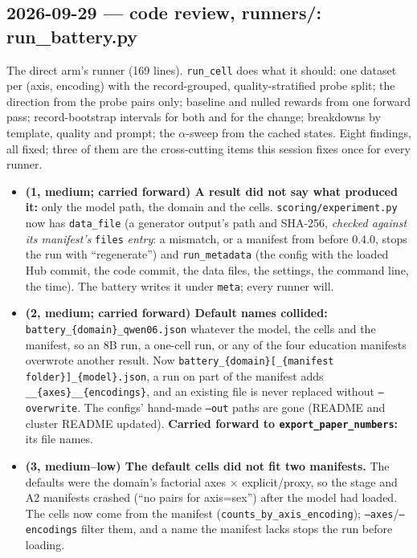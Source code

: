 \documentclass{article}
\begin{document}
\subsection*{2026-09-29 --- code review, runners/: run\_battery.py}
The direct arm's runner (169 lines). \texttt{run\_cell} does what it should: one dataset per (axis, encoding) with
the record-grouped, quality-stratified probe split; the direction from the probe pairs only; baseline and nulled
rewards from one forward pass; record-bootstrap intervals for both and for the change; breakdowns by template,
quality and prompt; the $\alpha$-sweep from the cached states. Eight findings, all fixed; three of them are the
cross-cutting items this session fixes once for every runner.
\begin{itemize}
  \item \textbf{(1, medium; carried forward) A result did not say what produced it:} only the model path, the domain
        and the cells. \texttt{scoring/experiment.py} now has \texttt{data\_file} (a generator output's path and
        SHA-256, \emph{checked against its manifest's} \texttt{files} \emph{entry}: a mismatch, or a manifest from
        before 0.4.0, stops the run with ``regenerate'') and \texttt{run\_metadata} (the config with the loaded Hub
        commit, the code commit, the data files, the settings, the command line, the time). The battery writes it
        under \texttt{meta}; every runner will.
  \item \textbf{(2, medium; carried forward) Default names collided:} \texttt{battery\_\{domain\}\_qwen06.json}
        whatever the model, the cells and the manifest, so an 8B run, a one-cell run, or any of the four education
        manifests overwrote another result. Now \texttt{battery\_\{domain\}[\_\{manifest folder\}]\_\{model\}.json},
        a run on part of the manifest adds \texttt{\_\_\{axes\}\_\_\{encodings\}}, and an existing file is never
        replaced without \texttt{--overwrite}. The configs' hand-made \texttt{--out} paths are gone (README and
        cluster README updated). \textbf{Carried forward to \texttt{export\_paper\_numbers}:} its file names.
  \item \textbf{(3, medium--low) The default cells did not fit two manifests.} The defaults were the domain's
        factorial axes $\times$ explicit/proxy, so the stage and A2 manifests crashed (``no pairs for axis=sex'')
        after the model had loaded. The cells now come from the manifest (\texttt{counts\_by\_axis\_encoding});
        \texttt{--axes}/\texttt{--encodings} filter them, and a name the manifest lacks stops the run before loading.

\end{itemize}
\end{document}
